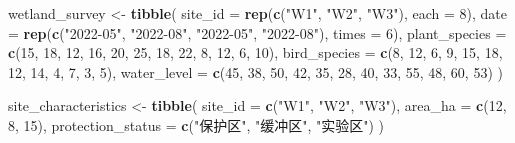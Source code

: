 \documentclass[
  twoside]{book}
\newenvironment{Shaded}{\begin{snugshade}}{\end{snugshade}}
\newcommand{\AttributeTok}[1]{\textcolor[rgb]{0.13,0.29,0.53}{#1}}
\newcommand{\DecValTok}[1]{\textcolor[rgb]{0.00,0.00,0.81}{#1}}
\newcommand{\FunctionTok}[1]{\textcolor[rgb]{0.13,0.29,0.53}{\textbf{#1}}}
\newcommand{\NormalTok}[1]{#1}
\newcommand{\OtherTok}[1]{\textcolor[rgb]{0.56,0.35,0.01}{#1}}
\newcommand{\StringTok}[1]{\textcolor[rgb]{0.31,0.60,0.02}{#1}}
\begin{document}
\begin{Shaded}
\begin{Highlighting}[]
\NormalTok{wetland\_survey }\OtherTok{\textless{}{-}} \FunctionTok{tibble}\NormalTok{(}
  \AttributeTok{site\_id =} \FunctionTok{rep}\NormalTok{(}\FunctionTok{c}\NormalTok{(}\StringTok{"W1"}\NormalTok{, }\StringTok{"W2"}\NormalTok{, }\StringTok{"W3"}\NormalTok{), }\AttributeTok{each =} \DecValTok{8}\NormalTok{),}
  \AttributeTok{date =} \FunctionTok{rep}\NormalTok{(}\FunctionTok{c}\NormalTok{(}\StringTok{"2022{-}05"}\NormalTok{, }\StringTok{"2022{-}08"}\NormalTok{, }\StringTok{"2022{-}05"}\NormalTok{, }\StringTok{"2022{-}08"}\NormalTok{), }\AttributeTok{times =} \DecValTok{6}\NormalTok{),}
  \AttributeTok{plant\_species =} \FunctionTok{c}\NormalTok{(}\DecValTok{15}\NormalTok{, }\DecValTok{18}\NormalTok{, }\DecValTok{12}\NormalTok{, }\DecValTok{16}\NormalTok{, }\DecValTok{20}\NormalTok{, }\DecValTok{25}\NormalTok{, }\DecValTok{18}\NormalTok{, }\DecValTok{22}\NormalTok{, }\DecValTok{8}\NormalTok{, }\DecValTok{12}\NormalTok{, }\DecValTok{6}\NormalTok{, }\DecValTok{10}\NormalTok{),}
  \AttributeTok{bird\_species =} \FunctionTok{c}\NormalTok{(}\DecValTok{8}\NormalTok{, }\DecValTok{12}\NormalTok{, }\DecValTok{6}\NormalTok{, }\DecValTok{9}\NormalTok{, }\DecValTok{15}\NormalTok{, }\DecValTok{18}\NormalTok{, }\DecValTok{12}\NormalTok{, }\DecValTok{14}\NormalTok{, }\DecValTok{4}\NormalTok{, }\DecValTok{7}\NormalTok{, }\DecValTok{3}\NormalTok{, }\DecValTok{5}\NormalTok{),}
  \AttributeTok{water\_level =} \FunctionTok{c}\NormalTok{(}\DecValTok{45}\NormalTok{, }\DecValTok{38}\NormalTok{, }\DecValTok{50}\NormalTok{, }\DecValTok{42}\NormalTok{, }\DecValTok{35}\NormalTok{, }\DecValTok{28}\NormalTok{, }\DecValTok{40}\NormalTok{, }\DecValTok{33}\NormalTok{, }\DecValTok{55}\NormalTok{, }\DecValTok{48}\NormalTok{, }\DecValTok{60}\NormalTok{, }\DecValTok{53}\NormalTok{)}
\NormalTok{)}

\NormalTok{site\_characteristics }\OtherTok{\textless{}{-}} \FunctionTok{tibble}\NormalTok{(}
  \AttributeTok{site\_id =} \FunctionTok{c}\NormalTok{(}\StringTok{"W1"}\NormalTok{, }\StringTok{"W2"}\NormalTok{, }\StringTok{"W3"}\NormalTok{),}
  \AttributeTok{area\_ha =} \FunctionTok{c}\NormalTok{(}\DecValTok{12}\NormalTok{, }\DecValTok{8}\NormalTok{, }\DecValTok{15}\NormalTok{),}
  \AttributeTok{protection\_status =} \FunctionTok{c}\NormalTok{(}\StringTok{"保护区"}\NormalTok{, }\StringTok{"缓冲区"}\NormalTok{, }\StringTok{"实验区"}\NormalTok{)}
\NormalTok{)}
\end{Highlighting}
\end{Shaded}
\end{document}
